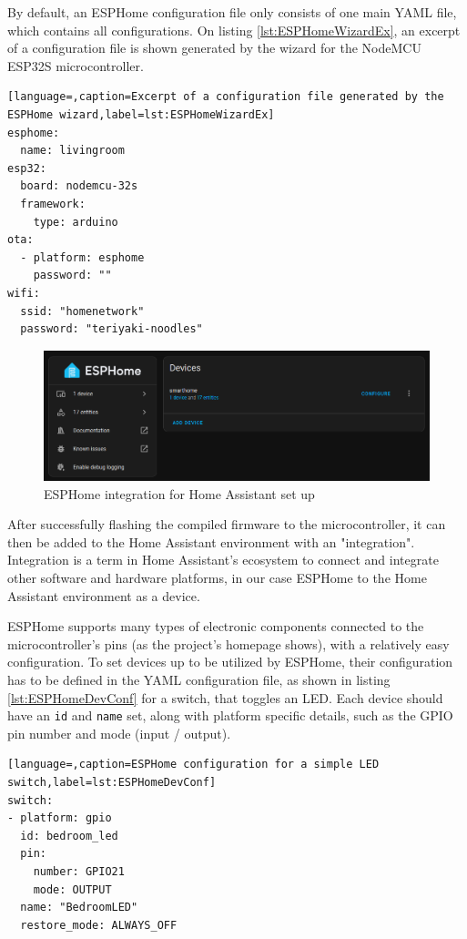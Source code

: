 By default, an ESPHome configuration file only consists of one main YAML file, which contains all configurations. On listing \ref{lst:ESPHomeWizardEx}, an excerpt of a configuration file is shown generated by the wizard for the NodeMCU ESP32S microcontroller.

\begin{lstlisting}[language=,caption=Excerpt of a configuration file generated by the ESPHome wizard,label=lst:ESPHomeWizardEx]
esphome:
  name: livingroom
esp32:
  board: nodemcu-32s
  framework:
    type: arduino
ota:
  - platform: esphome
    password: ""
wifi:
  ssid: "homenetwork"
  password: "teriyaki-noodles"
\end{lstlisting}

\begin{figure}[!ht]
  \centering
  \includegraphics[width=150mm, keepaspectratio]{figures/homeassistant_esphome_int.png}
  \caption{ESPHome integration for Home Assistant set up}
  \label{fig:HAesphomeint}
\end{figure}

After successfully flashing the compiled firmware to the microcontroller, it can then be added to the Home Assistant environment with an "integration". Integration is a term in Home Assistant's ecosystem to connect and integrate other software and hardware platforms, in our case ESPHome to the Home Assistant environment as a device. \cite{HAConceptsTerminology}

ESPHome supports many types of electronic components connected to the microcontroller's pins (as the project's homepage shows), with a relatively easy configuration. \cite{ESPHomeHomepage} To set devices up to be utilized by ESPHome, their configuration has to be defined in the YAML configuration file, as shown in listing \ref{lst:ESPHomeDevConf} for a switch, that toggles an LED. Each device should have an \verb+id+ and \verb+name+ set, along with platform specific details, such as the GPIO pin number and mode (input / output).

\begin{lstlisting}[language=,caption=ESPHome configuration for a simple LED switch,label=lst:ESPHomeDevConf]
switch:
- platform: gpio
  id: bedroom_led
  pin:
    number: GPIO21
    mode: OUTPUT
  name: "BedroomLED"
  restore_mode: ALWAYS_OFF
\end{lstlisting}

